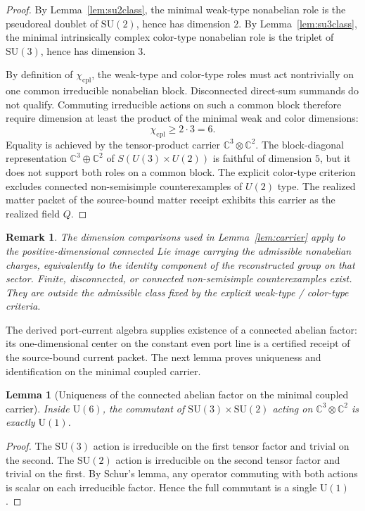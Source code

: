 \documentclass[11pt]{article}
\newtheorem{lemma}[theorem]{Lemma}
\newtheorem{remark}[theorem]{Remark}
\newcommand{\SU}{\mathrm{SU}}
\newcommand{\U}{\mathrm{U}}
\begin{document}
\begin{proof}
By Lemma~\ref{lem:su2class}, the minimal weak-type nonabelian role is the pseudoreal doublet of $\SU(2)$, hence has dimension $2$. By Lemma~\ref{lem:su3class}, the minimal intrinsically complex color-type nonabelian role is the triplet of $\SU(3)$, hence has dimension $3$.

By definition of $\chi_{\mathrm{cpl}}$, the weak-type and color-type roles must act nontrivially on one common irreducible nonabelian block. Disconnected direct-sum summands do not qualify. Commuting irreducible actions on such a common block therefore require dimension at least the product of the minimal weak and color dimensions:
\[
\chi_{\mathrm{cpl}}\ge 2\cdot 3=6.
\]
Equality is achieved by the tensor-product carrier $\mathbb C^3\otimes\mathbb C^2$. The block-diagonal representation $\mathbb C^3\oplus \mathbb C^2$ of $S(U(3)\times U(2))$ is faithful of dimension $5$, but it does not support both roles on a common block. The explicit color-type criterion excludes connected non-semisimple counterexamples of $U(2)$ type. The realized matter packet of the source-bound matter receipt exhibits this carrier as the realized field \(Q\).
\end{proof}

\begin{remark}\label{rem:connectedlie}
The dimension comparisons used in Lemma~\ref{lem:carrier} apply to the positive-dimensional connected Lie image carrying the admissible nonabelian charges, equivalently to the identity component of the reconstructed group on that sector. Finite, disconnected, or connected non-semisimple counterexamples exist. They are outside the admissible class fixed by the explicit weak-type / color-type criteria.
\end{remark}

The derived port-current algebra supplies existence of a connected abelian factor: its one-dimensional center on the constant even port line is a certified receipt of the source-bound current packet. The next lemma proves uniqueness and identification on the minimal coupled carrier.

\begin{lemma}[Uniqueness of the connected abelian factor on the minimal coupled carrier]\label{lem:commutant}
Inside $\U(6)$, the commutant of $\SU(3)\times\SU(2)$ acting on $\mathbb C^3\otimes \mathbb C^2$ is exactly $\U(1)$.
\end{lemma}

\begin{proof}
The $\SU(3)$ action is irreducible on the first tensor factor and trivial on the second. The $\SU(2)$ action is irreducible on the second tensor factor and trivial on the first. By Schur's lemma, any operator commuting with both actions is scalar on each irreducible factor. Hence the full commutant is a single $\U(1)$.
\end{proof}
\end{document}
